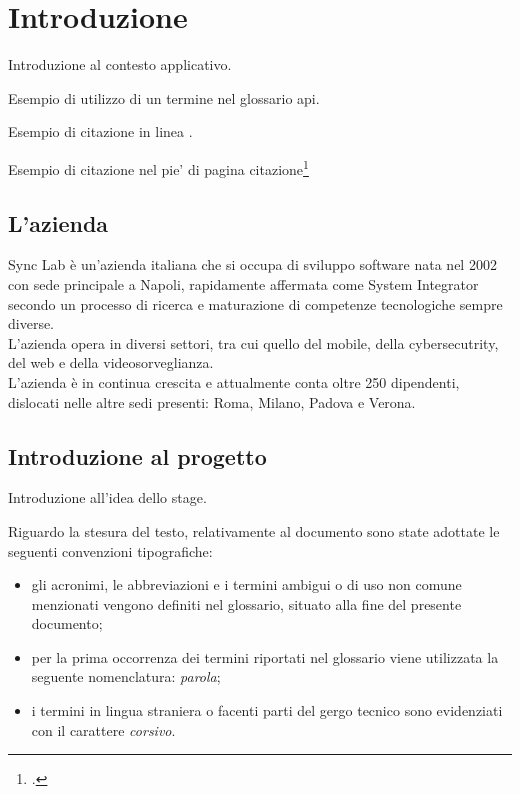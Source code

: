 \chapter{Introduzione}\label{cap:introduzione}

Introduzione al contesto applicativo.

\noindent Esempio di utilizzo di un termine nel glossario 
\gls{api}. 

\noindent Esempio di citazione in linea 
\cite{site:agile-manifesto}. 

\noindent Esempio di citazione nel pie' di pagina
citazione\footcite{womak:lean-thinking}

\section{L'azienda}

Sync Lab è un'azienda italiana che si occupa di sviluppo software nata nel 2002 con sede principale a Napoli,
rapidamente affermata come System Integrator secondo un processo di ricerca e maturazione di competenze tecnologiche sempre diverse.\\
L'azienda opera in diversi settori, tra cui quello del mobile, della cybersecutrity, del web e della videosorveglianza. \\
L'azienda è in continua crescita e attualmente conta oltre 250 dipendenti, dislocati nelle altre sedi presenti: Roma, Milano, Padova e Verona.

\section{Introduzione al progetto}

Introduzione all'idea dello stage.

Riguardo la stesura del testo, relativamente al documento sono state adottate le seguenti convenzioni tipografiche:
\begin{itemize}
	\item gli acronimi, le abbreviazioni e i termini ambigui o di uso non comune menzionati vengono definiti nel glossario, situato alla fine del presente documento;
	\item per la prima occorrenza dei termini riportati nel glossario viene utilizzata la seguente nomenclatura: \emph{parola}\glsfirstoccur;
	\item i termini in lingua straniera o facenti parti del gergo tecnico sono evidenziati con il carattere \emph{corsivo}.
\end{itemize}

